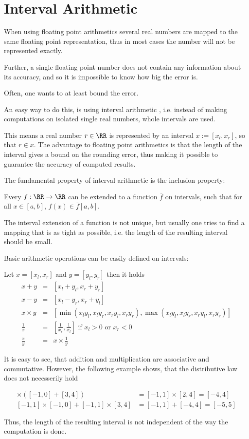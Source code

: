\section{Interval Arithmetic}
	When using floating point arithmetics several real numbers are mapped to the
  same floating point representation, thus in most cases the number will not be
  represented exactly.

	Further, a single floating point number does not contain any information
  about its accuracy, and so it is impossible to know how big the error is.

	Often, one wants to at least bound the error. 
    
  An easy way to do this, is using interval arithmetic \cite{Kearfott1996}, i.e. instead of making
  computations on isolated single real numbers, whole intervals are used.

	This means a real number $r \in \RR$ is represented by an interval $x := [x_l,x_r]$, so that $r \in x$.
	The advantage to floating point arithmetics is that the length of the interval gives a bound on the rounding error, 
	thus making it possible to guarantee the accuracy of computed results.

	The fundamental property of interval arithmetic is the inclusion property:

	Every $f: \RR \to \RR$ can be extended to a function $\bar f$ on intervals, such that for all $x \in [a,b]$, $f(x) \in \bar f[a,b]$. 

	The interval extension of a function is not unique, but usually one tries to
  find a mapping that is as tight as possible, i.e. the length of the resulting interval
  should be small.
  
  Basic arithmetic operations can be easily defined on intervals:
	\begin{theorem}
		Let $x = [x_l, x_r]$ and $y = [y_l, y_r]$ then it holds
		\begin{eqnarray}
			x + y  & = & [x_l + y_l, x_r + y_r] \\
			x - y  & = & [x_l - y_r, x_r + y_l] \\
			x \times y  & = & [\min(x_ly_l, x_ly_r, x_ry_l, x_ry_r), \max(x_ly_l, x_ly_r, x_ry_l, x_ry_r)] \\
			\frac{1}{x} & = & \left[\frac{1}{x_r}, \frac{1}{x_l} \right] \text{ if } x_l > 0 \text{ or } x_r < 0 \\
			\frac{x}{y} & = & x \times \frac{1}{y}   
		\end{eqnarray}
	\end{theorem}
	It is easy to see, that addition and multiplication are associative and commutative.
	However, the following example shows, that the distributive law does not necesserily hold
	\begin{example}
		\begin{align*}
			[-1,1] \times ([-1,0] + [3,4])  &= [-1,1] \times [2,4] = [-4,4] \\
			[-1,1] \times [-1,0] + [-1,1] \times [3,4] &=  [-1,1] + [-4,4] =[-5,5] 
		\end{align*}
	\end{example} 
	Thus, the length of the resulting interval is not independent of the way the
  computation is done.
	
